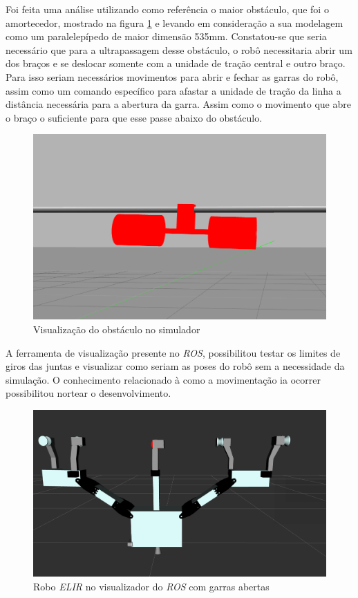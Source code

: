 Foi feita uma análise utilizando como referência o maior obstáculo, que foi o amortecedor, mostrado na figura \ref{fig:amortecedor} e levando em consideração a sua modelagem como um paralelepípedo de maior dimensão 535mm. Constatou-se que seria necessário que para a ultrapassagem desse obstáculo, o robô necessitaria abrir um dos braços e se deslocar somente com a unidade de tração central e outro braço. Para isso seriam necessários movimentos para abrir e fechar as garras do robô, assim como um comando específico para afastar a unidade de tração da linha a distância necessária para a abertura da garra. Assim como o movimento que abre o braço o suficiente para que esse passe abaixo do obstáculo.

\begin{figure}[H]
	\centering
	\includegraphics[scale=0.25]{Figures/obstaculo.png}
	\caption{Visualização do obstáculo no simulador}
	\label{fig:amortecedor}
\end{figure}

A ferramenta de visualização presente no \textit{ROS}, possibilitou testar os limites de giros das juntas e visualizar como seriam as poses do robô sem a necessidade da simulação. O conhecimento relacionado à como a movimentação ia ocorrer possibilitou nortear o desenvolvimento.

\begin{figure}[H]
	\centering
	\includegraphics[scale=0.25]{Figures/rviz_garra_aberta.png}
	\caption{Robo \textit{ELIR} no visualizador do \textit{ROS} com garras abertas}
	\label{fig:elir_garras abertas}
\end{figure}
